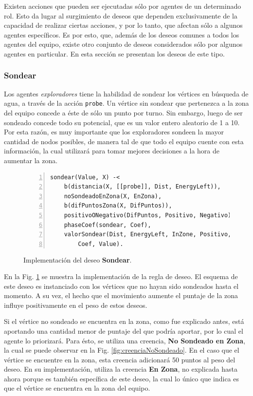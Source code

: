 \documentclass[oneside]{book}
\theoremstyle{definition}
\begin{document}
Existen acciones que pueden ser ejecutadas sólo por agentes de un determinado rol. Esto da 
lugar al surgimiento de deseos que dependen exclusivamente de la capacidad de realizar 
ciertas acciones, y por lo tanto, que afectan sólo a algunos agentes específicos. Es por esto, 
que, además de los deseos comunes a todos los agentes del equipo, existe otro conjunto de 
deseos considerados sólo por algunos agentes en particular. En esta sección se presentan 
los deseos de este tipo.


\subsubsection{Sondear}

Los agentes \textit{exploradores} tiene la habilidad de sondear los vértices en 
búsqueda de agua, a través de la acción \texttt{probe}. Un vértice sin sondear 
que pertenezca a la zona del equipo concede a éste de sólo un punto por turno. 
Sin embargo, luego de ser sondeado concede todo su potencial, que es un valor 
entero aleatorio de 1 a 10. Por esta razón, es muy importante que los 
exploradores sondeen la mayor cantidad de nodos posibles, de manera tal de que 
todo el equipo cuente con esta información, la cual utilizará para tomar 
mejores decisiones a la hora de aumentar la zona.

\begin{figure}[h]
\begin{Verbatim}[numbers=left]
sondear(Value, X) -< 
    b(distancia(X, [[probe]], Dist, EnergyLeft)),
    noSondeadoEnZona(X, EnZona),
    b(difPuntosZona(X, DifPuntos)),
    positivoONegativo(DifPuntos, Positivo, Negativo),
    phaseCoef(sondear, Coef),
    valorSondear(Dist, EnergyLeft, InZone, Positivo, Negativo, 
    	Coef, Value).
\end{Verbatim}
\caption{Implementación del deseo \textbf{Sondear}.}
\label{fig:deseoSondear}
\end{figure}

En la Fig. \ref{fig:deseoSondear} se muestra la implementación de la regla de 
deseo. El esquema de este deseo es instanciado con los vértices que no hayan 
sido sondeados hasta el momento. A su vez, el hecho que el movimiento aumente
el puntaje de la zona influye positivamente en el peso de estos deseos.

Si el vértice no sondeado se encuentra en la zona, como fue explicado antes,
está aportando una cantidad menor de puntaje del que podría aportar, por lo 
cual el agente lo priorizará. Para ésto, se utiliza una creencia,
\textbf{No Sondeado en Zona}, la cual se puede observar en la Fig. 
\ref{fig:creenciaNoSondeado}. En el caso que el vértice se encuentre en la 
zona, esta creencia adicionará 50 puntos al peso del deseo. En su 
implementación, utiliza la creencia \textbf{En Zona}, no explicada hasta
ahora porque es también específica de este deseo, la cual lo único que 
indica es que el vértice se encuentra en la zona del equipo.
\end{document}
